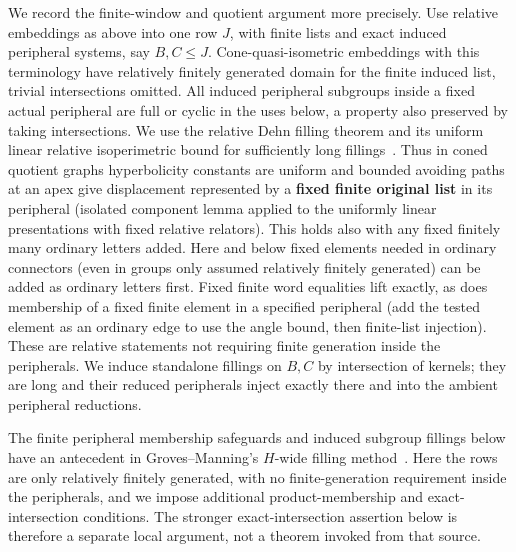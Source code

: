 We record the finite-window and quotient argument more precisely. Use relative embeddings as above into one row \(J\), with finite lists and exact induced peripheral systems, say \(B,C\le J\). Cone-quasi-isometric embeddings with this terminology have relatively finitely generated domain for the finite induced list, trivial intersections omitted. All induced peripheral subgroups inside a fixed actual peripheral are full or cyclic in the uses below, a property also preserved by taking intersections. We use the relative Dehn filling theorem and its uniform linear relative isoperimetric bound for sufficiently long fillings~\cite{Osin2007}. Thus in coned quotient graphs hyperbolicity constants are uniform and bounded avoiding paths at an apex give displacement represented by a \textbf{fixed finite original list} in its peripheral (isolated component lemma applied to the uniformly linear presentations with fixed relative relators). This holds also with any fixed finitely many ordinary letters added. Here and below fixed elements needed in ordinary connectors (even in groups only assumed relatively finitely generated) can be added as ordinary letters first. Fixed finite word equalities lift exactly, as does membership of a fixed finite element in a specified peripheral (add the tested element as an ordinary edge to use the angle bound, then finite-list injection). These are relative statements not requiring finite generation inside the peripherals. We induce standalone fillings on \(B,C\) by intersection of kernels; they are long and their reduced peripherals inject exactly there and into the ambient peripheral reductions.

The finite peripheral membership safeguards and induced subgroup fillings below have an antecedent in Groves--Manning's \(H\)-wide filling method~\cite[Definitions~3.1--3.3 and Propositions~4.5--4.6]{GrovesManning2019}. Here the rows are only relatively finitely generated, with no finite-generation requirement inside the peripherals, and we impose additional product-membership and exact-intersection conditions. The stronger exact-intersection assertion below is therefore a separate local argument, not a theorem invoked from that source.

